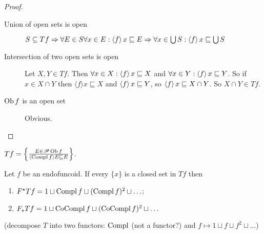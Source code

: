 \begin{proof}
  
  \begin{description}
    \item[Union of open sets is open] $S \subseteq T f \Rightarrow \forall E
    \in S \forall x \in E : \left\langle f\right\rangle x \sqsubseteq E \Rightarrow
    \forall x \in \bigcup S : \left\langle f\right\rangle x \sqsubseteq \bigcup S$
    
    \item[Intersection of two open sets is open] Let $X, Y \in T f$. Then
    $\forall x \in X : \left\langle f\right\rangle x \sqsubseteq X$ and $\forall x \in Y
    : \left\langle f\right\rangle x \sqsubseteq Y$. So if $x \in X \cap Y$ then $\langle
    f \rangle x \sqsubseteq X$ and $\left\langle f\right\rangle x \sqsubseteq Y$, so
    $\left\langle f\right\rangle x \sqsubseteq X \cap Y$. So $X \cap Y \in T f$.
    
    \item[$\operatorname{Ob} f$ is an open set] Obvious.
  \end{description}
\end{proof}

\begin{obvious}
$T f = \left\{ \frac{ E \in \mathscr{P} \operatorname{Ob} f }{ \langle
\operatorname{Compl} f \rangle E \sqsubseteq E }\right\}$.
\end{obvious}

\begin{thm}
  Let $f$ be an endofuncoid. If every $\{ x \}$ is a closed set in $T f$ then
  \begin{enumerate}
    \item $F^{\star} T f = 1 \sqcup \operatorname{Compl} f \sqcup (\operatorname{Compl} f)^2
    \sqcup \ldots$;
    
    \item $F_{\star} T f = 1 \sqcup \operatorname{CoCompl} f \sqcup (\operatorname{CoCompl}
    f)^2 \sqcup \ldots$
  \end{enumerate}
  (decompose $T$ into two functors: $\operatorname{Compl}$ (not a functor?) and $f
  \mapsto 1 \sqcup f \sqcup f^2 \sqcup \ldots$)
\end{thm}

